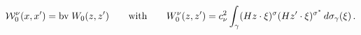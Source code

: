 \begin{equation}\label{eq:sca}
{\cal
W}^{\nu}_{0}(x,x')=\mbox{bv}\;W_{0}(z,z')\qquad\mbox{with}\qquad
W^\nu_{0}(z,z')= c_\nu^{2}\int_\gamma (Hz\cdot\xi)^{\sigma}(H
z'\cdot \xi )^{\sigma^{*}}\,d\sigma_\gamma(\xi)\,.
\end{equation}

